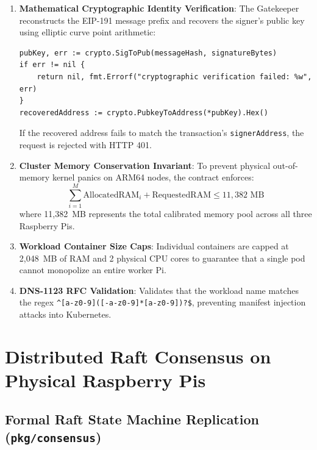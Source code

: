 \documentclass[a4paper,12pt]{article}
\begin{document}
\begin{enumerate}[leftmargin=1.2cm]
    \item \textbf{Mathematical Cryptographic Identity Verification}:
    The Gatekeeper reconstructs the EIP-191 message prefix and recovers the signer's public key using elliptic curve point arithmetic:
    \begin{lstlisting}[language=golang]
pubKey, err := crypto.SigToPub(messageHash, signatureBytes)
if err != nil {
    return nil, fmt.Errorf("cryptographic verification failed: %w", err)
}
recoveredAddress := crypto.PubkeyToAddress(*pubKey).Hex()
    \end{lstlisting}
    If the recovered address fails to match the transaction's \texttt{signerAddress}, the request is rejected with HTTP 401.
    \item \textbf{Cluster Memory Conservation Invariant}:
    To prevent physical out-of-memory kernel panics on ARM64 nodes, the contract enforces:
    \begin{equation}
    \sum_{i=1}^{M} \text{AllocatedRAM}_i + \text{RequestedRAM} \le 11,382 \text{ MB}
    \end{equation}
    where 11,382~MB represents the total calibrated memory pool across all three Raspberry Pis.
    \item \textbf{Workload Container Size Caps}:
    Individual containers are capped at 2,048~MB of RAM and 2 physical CPU cores to guarantee that a single pod cannot monopolize an entire worker Pi.
    \item \textbf{DNS-1123 RFC Validation}:
    Validates that the workload name matches the regex \lstinline|^[a-z0-9]([-a-z0-9]*[a-z0-9])?$|, preventing manifest injection attacks into Kubernetes.
\end{enumerate}



\newpage

\section{Distributed Raft Consensus on Physical Raspberry Pis}

\subsection{Formal Raft State Machine Replication (\texttt{pkg/consensus})}
\end{document}
